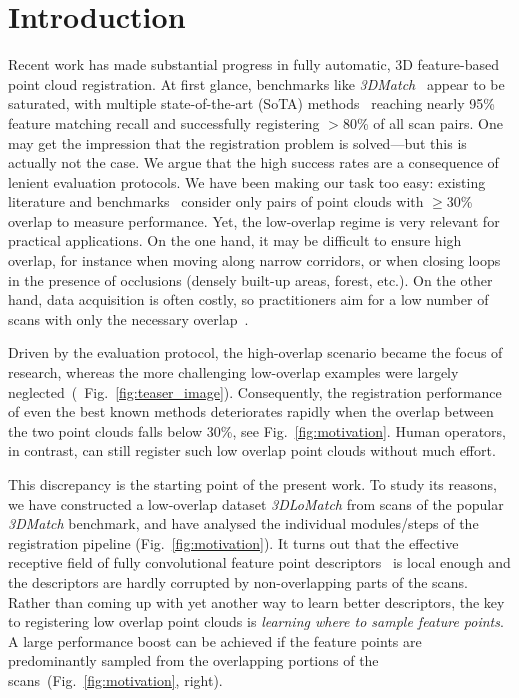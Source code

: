 \section{Introduction}
\label{sec:intro}
Recent work has made substantial progress in fully automatic, 3D feature-based point cloud registration. At first glance, benchmarks like \textit{3DMatch}~\cite{zeng20163dmatch} appear to be saturated, with multiple state-of-the-art (SoTA) methods~\cite{gojcic20193DSmoothNet,Choy2019FCGF,bai2020d3feat} reaching nearly 95\% feature matching recall and successfully registering $>$80\% of all scan pairs.
One may get the impression that the registration problem is solved---but this is actually not the case. We argue that the high success rates are a consequence of lenient evaluation protocols. We have been making our task too easy:
existing literature and benchmarks~\cite{choi2015robust, zeng20163dmatch, khoury2017CGF} consider only pairs of point clouds with $\geq$30\% overlap to measure performance.
Yet, the low-overlap regime is very relevant for practical applications. On the one hand, it may be difficult to ensure high overlap, for instance when moving along narrow corridors, or when closing loops in the presence of occlusions (densely built-up areas, forest, etc.). On the other hand, data acquisition is often costly, so practitioners aim for a low number of scans with only the necessary overlap~\cite{yang2019extreme,yang2020extreme}. 


Driven by the evaluation protocol, the high-overlap scenario became the focus of research, whereas the more challenging low-overlap examples were largely neglected~(\cf~Fig.~\ref{fig:teaser_image}).
Consequently, the registration performance of even the best known methods deteriorates rapidly when the overlap between the two point clouds falls below 30\%, see Fig.~\ref{fig:motivation}.
Human operators, in contrast, can still register such low overlap point clouds without much effort.%

This discrepancy is the starting point of the present work. %
To %
study its reasons, we have constructed a low-overlap dataset \textit{3DLoMatch} from scans of the popular \textit{3DMatch} benchmark, and have analysed the individual modules/steps of the registration pipeline (Fig.~\ref{fig:motivation}).
It turns out that the effective receptive field of fully convolutional feature point descriptors~\cite{Choy2019FCGF,bai2020d3feat} is local enough and the descriptors are hardly corrupted by non-overlapping parts of the scans. Rather than coming up with yet another way to learn better descriptors, the key to registering low overlap point clouds is \emph{learning where to sample feature points}. A large performance boost can be achieved if the feature points are predominantly sampled from the overlapping portions of the scans~(Fig.~\ref{fig:motivation}, right).

